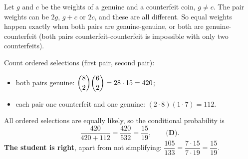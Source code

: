 Let $g$ and $c$ be the weights of a genuine and a counterfeit coin, $g\ne c$. The pair weights can be $2g$, $g+c$ or $2c$, and these are all different. So equal weights happen exactly when both pairs are genuine-genuine, or both are genuine-counterfeit (both pairs counterfeit-counterfeit is impossible with only two counterfeits).

Count ordered selections (first pair, second pair):
\begin{itemize}
\item both pairs genuine: $\dbinom82\dbinom62=28\cdot15=420$;
\item each pair one counterfeit and one genuine: $(2\cdot8)(1\cdot7)=112$.
\end{itemize}
All ordered selections are equally likely, so the conditional probability is
\[
\dfrac{420}{420+112}=\dfrac{420}{532}=\boxed{\dfrac{15}{19}},\qquad\textbf{(D)}.
\]
\textbf{The student is right}, apart from not simplifying: $\dfrac{105}{133}=\dfrac{7\cdot15}{7\cdot19}=\dfrac{15}{19}$.
